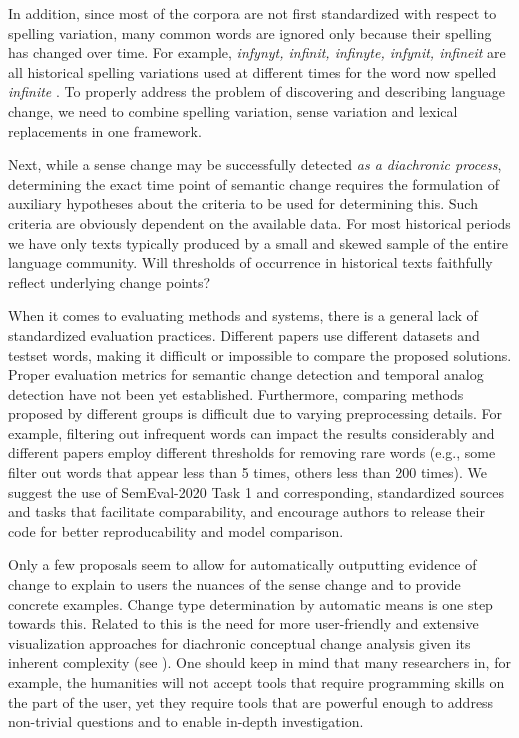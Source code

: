 \documentclass[output=paper]{langsci/langscibook}
\begin{document}
In addition, since most of the corpora are not first standardized with respect to spelling variation, many common words are ignored only because their spelling has changed over time. For example, \textit{infynyt, infinit, infinyte, infynit, infineit} are all historical spelling variations used at different times for the word now spelled \textit{infinite} \citep{oed}. To properly address the problem of discovering and describing language change, we need to combine spelling variation, sense variation and lexical replacements in one framework.

Next, while a sense change may be successfully detected \emph{as a diachronic process}, determining the exact time point of semantic change requires the formulation of auxiliary hypotheses about the criteria to be used for determining this. Such criteria are obviously dependent on the available data. For most historical periods we have only texts typically produced by a small and skewed sample of the entire language community. Will thresholds of occurrence in historical texts faithfully reflect underlying change points? 

When it comes to evaluating methods and systems, there is a general lack of standardized evaluation practices. Different papers use different datasets and testset words, making it difficult or impossible to compare the proposed solutions. Proper evaluation metrics for semantic change detection and temporal analog detection have not been yet established. Furthermore, comparing methods proposed by different groups is difficult due to varying preprocessing details. For example, filtering out infrequent words can impact the results considerably and different papers employ different thresholds for removing rare words (e.g., some filter out words that appear less than 5 times, others less than 200 times). We suggest the use of SemEval-2020 Task 1 \citep{schlechtweg-etal-2020-semeval} and corresponding, standardized sources and tasks that facilitate comparability, and encourage authors to release their code for better reproducability and model comparison. 

Only a few proposals seem to allow for automatically outputting evidence of change to explain to users the nuances of the sense change and to provide concrete examples. Change type determination by automatic means is one step towards this.  Related to this is the need for more user-friendly and extensive visualization approaches for diachronic conceptual change analysis given its inherent complexity (see \citealt{chapters/10}). One should keep in mind that many researchers in, for example, the humanities will not accept tools that require programming skills on the part of the user, yet they require tools that are powerful enough to address non-trivial questions and to enable in-depth investigation.
\end{document}
